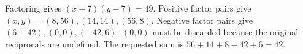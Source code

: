 Factoring gives $(x-7)(y-7)=49$. Positive factor pairs give $(x,y)=(8,56),(14,14),(56,8)$. Negative factor pairs give $(6,-42),(0,0),(-42,6)$; $(0,0)$ must be discarded because the original reciprocals are undefined. The requested sum is $56+14+8-42+6=\boxed{42}$.
